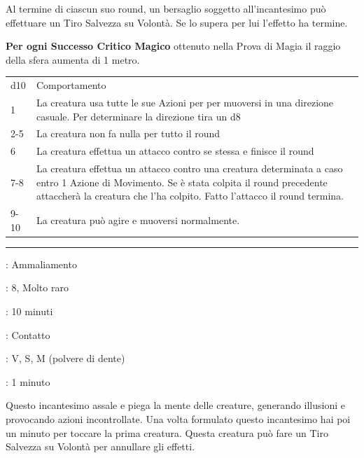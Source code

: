 \begin{multicols}{2}
Al termine di ciascun suo round, un bersaglio soggetto all'incantesimo può effettuare un Tiro Salvezza su Volontà. Se lo supera per lui l'effetto ha termine.

\textbf{Per ogni Successo Critico Magico} ottenuto nella Prova di Magia il raggio della sfera aumenta di 1 metro.

\medskip

\begin{tabularx}{0.45\textwidth}{lX}
	\hline
	d10 & Comportamento\\
	1 & La creatura usa tutte le sue Azioni per per muoversi in una direzione casuale. Per determinare la direzione tira un d8\\
	2-5 & La creatura non fa nulla per tutto il round\\
	6 & La creatura effettua un attacco contro se stessa e finisce il round\\
	7-8 & La creatura effettua un attacco contro una creatura determinata a caso entro 1 Azione di Movimento. Se è stata colpita il round precedente attaccherà la creatura che l'ha colpito. Fatto l'attacco il round termina.\\
	9-10 & La creatura può agire e muoversi normalmente.
\end{tabularx}

\smallskip\noindent\rule{\linewidth}{2pt} \hypertarget{Confusione Contagiosa}{}\medskip{}
\noindent
\begin{description}[noitemsep, topsep=0pt, parsep=0pt, partopsep=0pt, leftmargin=0cm, labelwidth=2.8cm]
	\item[\textbf{Lista di Magia}]: Ammaliamento
	\item[\textbf{Livello}]: 8, Molto raro
	\item[\textbf{T. di Lancio}]: 10 minuti
	\item[\textbf{Gittata}]: Contatto
	\item[\textbf{Componenti}]: V, S, M (polvere di dente)
	\item[\textbf{Durata}]: 1 minuto
\end{description}

Questo incantesimo assale e piega la mente delle creature, generando illusioni e provocando azioni incontrollate. Una volta formulato questo incantesimo hai poi un minuto per toccare la prima creatura. Questa creatura può fare un Tiro Salvezza su Volontà per annullare gli effetti.


\end{multicols}
